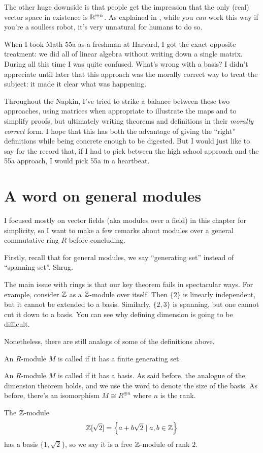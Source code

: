 The other huge downside is that people get the impression
that the only (real) vector space in existence is $\mathbb R^{\oplus n}$.
As explained in ,
while you \emph{can} work this way if you're a soulless robot,
it's very unnatural for humans to do so.

When I took Math 55a as a freshman at Harvard,
I got the exact opposite treatment:
we did all of linear algebra without writing down a single matrix.
During all this time I was quite confused.
What's wrong with a basis?
I didn't appreciate until later that this approach was the
morally correct way to treat the subject: it made it clear what was happening.

Throughout the Napkin, I've tried to strike a balance between these
two approaches, using matrices when appropriate to illustrate
the maps and to simplify proofs, but ultimately writing
theorems and definitions in their \emph{morally correct} form.
I hope that this has both the advantage of giving the ``right'' definitions
while being concrete enough to be digested.
But I would just like to say for the record that,
if I had to pick between the high school approach and the 55a approach,
I would pick 55a in a heartbeat.

\section{A word on general modules}
I focused mostly on vector fields (aka modules over a field) in this chapter
for simplicity, so I want to make a few remarks about
modules over a general commutative ring $R$ before concluding.

Firstly, recall that for general modules,
we say ``generating set'' instead of ``spanning set''.
Shrug.

The main issue with rings is that our key theorem 
fails in spectacular ways.
For example, consider $\mathbb Z$ as a $\mathbb Z$-module over itself.
Then $\{2\}$ is linearly independent, but it cannot be extended to a basis.
Similarly, $\{2,3\}$ is spanning, but one cannot cut it down to a basis.
You can see why defining dimension is going to be difficult.

Nonetheless, there are still analogs of some of the definitions above.
\begin{definition}
	An $R$-module $M$ is called  if it has a finite generating set.
\end{definition}
\begin{definition}
	An $R$-module $M$ is called  if it has a basis.
	As said before, the analogue of the dimension theorem holds,
	and we use the word  to denote the size of the basis.
	As before, there's an isomorphism $M \cong R^{\oplus n}$ where $n$ is the rank.
\end{definition}
\begin{example}
	The $\mathbb Z$-module
	\[ \mathbb Z[\sqrt2] = \left\{ a + b\sqrt 2 \mid a,b \in \mathbb Z \right\} \]
	has a basis $\{1, \sqrt 2\}$, so we say it is
	a free $\mathbb Z$-module of rank $2$.
\end{example}

